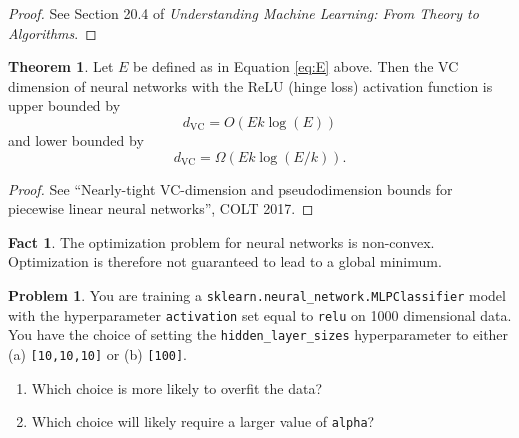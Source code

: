 \documentclass[10pt]{exam}
\theoremstyle{definition}
\newtheorem{problem}{Problem}
\newtheorem{fact}{Fact}
\newtheorem{theorem}{Theorem}
\newcommand{\dvc}{{d_{\text{VC}}}}
\begin{document}
\begin{proof}
    See Section 20.4 of \emph{Understanding Machine Learning: From Theory to Algorithms}.
\end{proof}

\begin{theorem}
    Let $E$ be defined as in Equation \eqref{eq:E} above.
    Then the VC dimension of neural networks with the ReLU (hinge loss) activation function is upper bounded by
    \begin{equation}
        \dvc = O(Ek\log(E))
    \end{equation}
    and lower bounded by
    \begin{equation}
        \dvc = \Omega(Ek\log(E/k)).
    \end{equation}
\end{theorem}

\begin{proof}
    See ``Nearly-tight VC-dimension and pseudodimension bounds for piecewise linear neural networks'', COLT 2017.
\end{proof}

\begin{fact}
    The optimization problem for neural networks is non-convex.
    Optimization is therefore not guaranteed to lead to a global minimum.
\end{fact}


\newpage
\begin{problem}
    You are training a \lstinline{sklearn.neural_network.MLPClassifier} model with the hyperparameter \lstinline{activation} set equal to \lstinline{relu} on 1000 dimensional data.
    You have the choice of setting the \lstinline{hidden_layer_sizes} hyperparameter to either (a) \lstinline{[10,10,10]} or (b) \lstinline{[100]}.
    \begin{enumerate}
        \item Which choice is more likely to overfit the data?
            \vspace{3in}
        \item Which choice will likely require a larger value of \lstinline{alpha}?
            \vspace{3in}
    \end{enumerate}
\end{problem}
\end{document}
